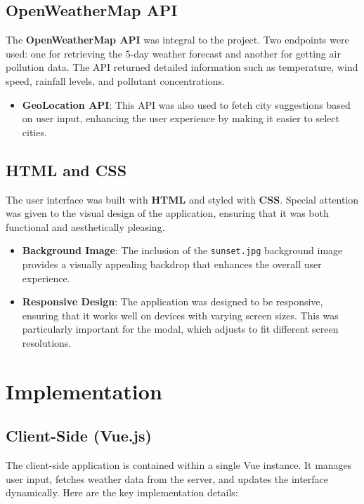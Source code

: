 \documentclass{article}
\begin{document}
\subsection*{OpenWeatherMap API}

The \textbf{OpenWeatherMap API} was integral to the project. Two endpoints were used: one for retrieving the 5-day weather forecast and another for getting air pollution data. The API returned detailed information such as temperature, wind speed, rainfall levels, and pollutant concentrations.

\begin{itemize}
    \item \textbf{GeoLocation API}: This API was also used to fetch city suggestions based on user input, enhancing the user experience by making it easier to select cities.
\end{itemize}

\subsection*{HTML and CSS}

The user interface was built with \textbf{HTML} and styled with \textbf{CSS}. Special attention was given to the visual design of the application, ensuring that it was both functional and aesthetically pleasing.

\begin{itemize}
    \item \textbf{Background Image}: The inclusion of the \texttt{sunset.jpg} background image provides a visually appealing backdrop that enhances the overall user experience.
    
    \item \textbf{Responsive Design}: The application was designed to be responsive, ensuring that it works well on devices with varying screen sizes. This was particularly important for the modal, which adjusts to fit different screen resolutions.
\end{itemize}

\section*{Implementation}

\subsection*{Client-Side (Vue.js)}

The client-side application is contained within a single Vue instance. It manages user input, fetches weather data from the server, and updates the interface dynamically. Here are the key implementation details:
\end{document}
